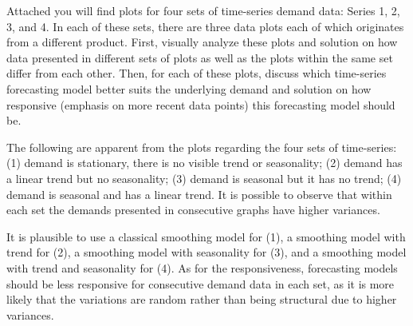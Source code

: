 \begin{question} \label{plots} 
Attached you will find plots for four sets of time-series demand data: Series 1, 2, 3, and 4. In each of these sets, there are three data plots each of which originates from a different product. First, visually analyze these plots and solution on how data presented in different sets of plots as well as the plots within the same set differ from each other. Then, for each of these plots, discuss which time-series forecasting model better suits the underlying demand and solution on how responsive (emphasis on more recent data points) this forecasting model should be.

\end{question}

  \begin{solution}
The following are apparent from the plots regarding the four sets of time-series: (1) demand is stationary, there is no visible trend or seasonality; (2) demand has a linear trend but no seasonality; (3) demand is seasonal but it has no trend; (4) demand is seasonal and has a linear trend. It is possible to observe that within each set the demands presented in consecutive graphs have higher variances. 

It is plausible to use a classical smoothing model for (1), a smoothing model with trend for (2), a smoothing model with seasonality for (3), and a smoothing model with trend and seasonality for (4). As for the responsiveness, forecasting models should be less responsive for consecutive demand data in each set, as it is more likely that the variations are random rather than being structural due to higher variances. 
  \end{solution}


%   










